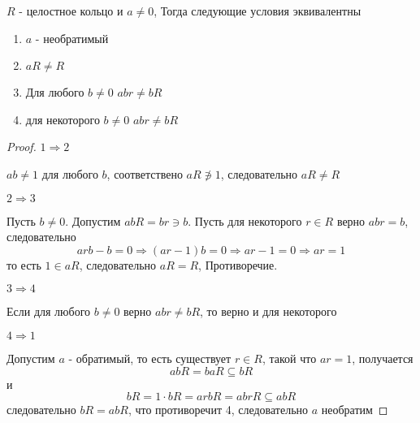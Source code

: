 \documentclass[../main/document.tex]{subfiles}
\begin{document}
\begin{thm}
$R$ - целостное кольцо и $a\neq 0$, Тогда следующие условия эквивалентны
\begin{enumerate}
\item $a$ - необратимый
\item $aR\neq R$
\item Для любого $b\neq 0$ $abr\neq bR$
\item для некоторого $b\neq 0$ $abr\neq bR$
\end{enumerate}
\begin{proof}

$1\Rightarrow 2$

$ab\neq 1$ для любого $b$, соответствено $aR\not\ni 1$, следовательно $aR\neq R$

$2\Rightarrow 3$

Пусть $b\neq 0$. Допустим $abR=br\ni b$. Пусть для некоторого $r\in R$ верно $abr=b$, следовательно
$$arb-b=0\Rightarrow (ar-1)b=0\Rightarrow ar-1=0\Rightarrow ar=1$$
то есть $1\in aR$, следовательно $aR=R$, Противоречие.

$3\Rightarrow 4$

Если для любого  $b\neq 0$ верно $abr\neq bR$, то верно и для некоторого

$4\Rightarrow 1$

Допустим $a$ - обратимый, то есть существует $r\in R$, такой что $ar=1$, получается
$$abR=baR\subseteq bR$$
и
$$bR=1\cdot bR=arbR=abrR\subseteq abR$$
следовательно $bR=abR$, что противоречит 4, следовательно $a$ необратим
\end{proof}
\end{thm}
\end{document}
